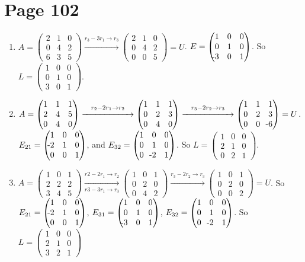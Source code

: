 \documentclass[11pt,twoside]{article}
\newcommand{\makearrow}[2]{\overset{#1}{\underset{#2}{\xrightarrow{\hspace{2cm}}}}}
\newcommand{\bpm}{\begin{pmatrix}}
\newcommand{\epm}{\end{pmatrix}}
\newcommand{\mn}{\llap{-}}
\begin{document}
\section*{Page 102}
\begin{enumerate}
\item[5.] $A = \bpm 2 & 1 & 0 \\ 0 & 4 & 2 \\ 6 & 3 & 5\epm \makearrow{r_3 - 3r_1 \rightarrow r_3}{} \bpm 2 & 1 & 0 \\ 0 & 4 & 2 \\ 0 & 0 & 5\epm = U$. $E = \bpm 1 & 0 & 0 \\ 0 & 1 & 0 \\ \mn3 & 0 & 1\epm$. So $L = \bpm 1 & 0 & 0 \\ 0 & 1 & 0 \\ 3 & 0 & 1\epm$.\\

\item[6.] $A = \bpm 1 & 1 & 1 \\ 2 & 4 & 5 \\ 0 & 4 & 0 \epm \makearrow{r_2-2r_1\rightarrow r_2}{}\bpm 1 & 1 & 1 \\ 0 & 2 & 3 \\ 0 & 4 & 0 \epm \makearrow{r_3 -2r_2 \rightarrow r_3}{} \bpm 1 & 1 & 1 \\ 0 & 2 & 3 \\ 0 & 0 & \mn6 \epm = U$. $E_{21} = \bpm 1&0&0\\ \mn2&1&0 \\ 0&0&1\epm$, and $E_{32} = \bpm 1&0&0 \\ 0&1&0 \\ 0&\mn2&1\epm$. So $L=\bpm 1&0&0 \\ 2&1&0 \\ 0&2&1\epm$.\\

\item[7.] $A = \bpm 1 & 0 & 1 \\ 2 & 2 & 2 \\ 3 & 4 & 5 \epm \makearrow{r2-2r_1 \rightarrow r_2}{r3-3r_1 \rightarrow r_3} \bpm 1 & 0 & 1 \\ 0 & 2 & 0 \\ 0 & 4 & 2 \epm
\makearrow{r_3 - 2r_2\rightarrow r_3}{} \bpm 1 & 0 & 1 \\ 0 & 2 & 0 \\ 0 & 0 & 2 \epm = U$. So $E_{21} = \bpm 1 & 0 & 0 \\ \mn2 & 1 & 0 \\ 0 & 0 & 1\epm$, $E_{31} = \bpm 1 & 0 & 0 \\ 0 & 1 & 0 \\ \mn3 & 0 & 1\epm$, $E_{32} = \bpm 1 & 0 & 0 \\ 0 & 1 & 0 \\ 0 & \mn2 & 1\epm$. So $L = \bpm 1 & 0 & 0 \\ 2 & 1 & 0 \\ 3 & 2 & 1\epm$\\


\end{enumerate}
\end{document}
